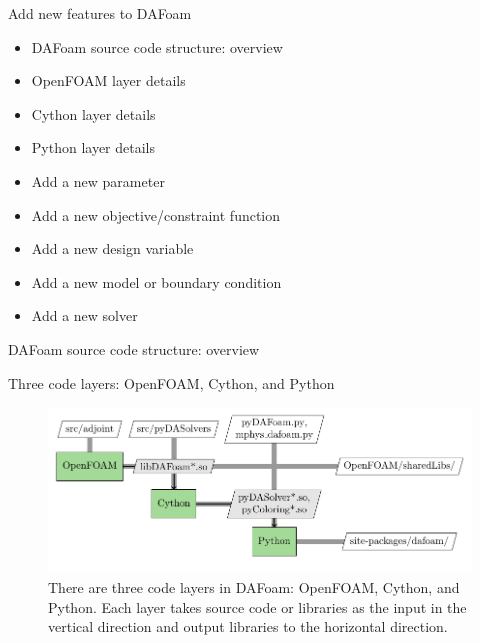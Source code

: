 \documentclass{bredelebeamer}
\begin{document}
\begin{frame}{}
  \center \Large Add new features to DAFoam
  \normalsize
  \begin{itemize}
    \setlength\itemsep{1em}
    \item DAFoam source code structure: overview
    \item OpenFOAM layer details
    \item Cython layer details
    \item Python layer details
    \item Add a new parameter
    \item Add a new objective/constraint function
    \item Add a new design variable
    \item Add a new model or boundary condition
    \item Add a new solver
  \end{itemize}
\end{frame}

\begin{frame}{}
  \center \Large DAFoam source code structure: overview
\end{frame}

\begin{frame}{Three code layers: OpenFOAM, Cython, and Python}
\begin{figure}
\includegraphics[width=1.05\linewidth]{images/dafoam_layers.pdf} 
\caption{There are three code layers in DAFoam: OpenFOAM, Cython, and Python. Each layer takes source code or libraries as the input in the vertical direction and output libraries to the horizontal direction.}
\end{figure}
\end{frame}
\end{document}
